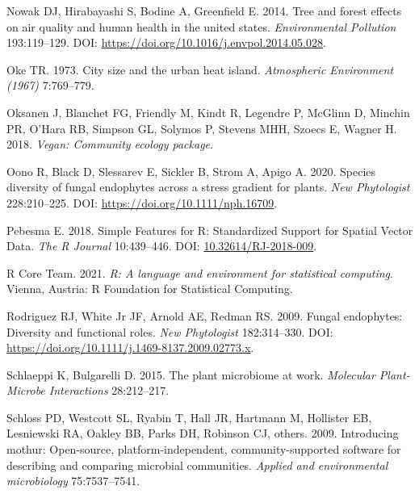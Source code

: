 \documentclass[fleqn,10pt,lineno]{wlpeerj} %
\newlength{\cslhangindent}
\newenvironment{CSLReferences}[2] %
 {%
  \setlength{\parindent}{0pt}
  \ifodd #1 \everypar{\setlength{\hangindent}{\cslhangindent}}\ignorespaces\fi
  \ifnum #2 > 0
  \setlength{\parskip}{#2\baselineskip}
  \fi
 }%
 {}
\begin{document}
\begin{CSLReferences}{1}{0}
\leavevmode{}%
Nowak DJ, Hirabayashi S, Bodine A, Greenfield E. 2014. Tree and forest effects on air quality and human health in the united states. \emph{Environmental Pollution} 193:119--129. DOI: \url{https://doi.org/10.1016/j.envpol.2014.05.028}.

\leavevmode{}%
Oke TR. 1973. City size and the urban heat island. \emph{Atmospheric Environment (1967)} 7:769--779.

\leavevmode{}%
Oksanen J, Blanchet FG, Friendly M, Kindt R, Legendre P, McGlinn D, Minchin PR, O'Hara RB, Simpson GL, Solymos P, Stevens MHH, Szoecs E, Wagner H. 2018. \emph{Vegan: Community ecology package}.

\leavevmode{}%
Oono R, Black D, Slessarev E, Sickler B, Strom A, Apigo A. 2020. Species diversity of fungal endophytes across a stress gradient for plants. \emph{New Phytologist} 228:210--225. DOI: \url{https://doi.org/10.1111/nph.16709}.

\leavevmode{}%
Pebesma E. 2018. {Simple Features for R: Standardized Support for Spatial Vector Data}. \emph{{The R Journal}} 10:439--446. DOI: \href{https://doi.org/10.32614/RJ-2018-009}{10.32614/RJ-2018-009}.

\leavevmode{}%
R Core Team. 2021. \emph{R: A language and environment for statistical computing}. Vienna, Austria: R Foundation for Statistical Computing.

\leavevmode{}%
Rodriguez RJ, White Jr JF, Arnold AE, Redman RS. 2009. Fungal endophytes: Diversity and functional roles. \emph{New Phytologist} 182:314--330. DOI: \url{https://doi.org/10.1111/j.1469-8137.2009.02773.x}.

\leavevmode{}%
Schlaeppi K, Bulgarelli D. 2015. The plant microbiome at work. \emph{Molecular Plant-Microbe Interactions} 28:212--217.

\leavevmode{}%
Schloss PD, Westcott SL, Ryabin T, Hall JR, Hartmann M, Hollister EB, Lesniewski RA, Oakley BB, Parks DH, Robinson CJ, others. 2009. Introducing mothur: Open-source, platform-independent, community-supported software for describing and comparing microbial communities. \emph{Applied and environmental microbiology} 75:7537--7541.


\end{CSLReferences}
\end{document}
